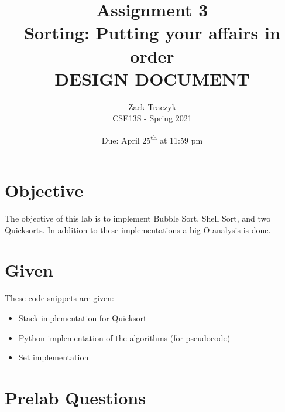 \documentclass[12pt]{article}
\title{%
    \textbf{Assignment 3 \\ 
    Sorting: Putting your affairs in order \\
    \large DESIGN DOCUMENT} }
\author{Zack Traczyk \\ CSE13S - Spring 2021}
\date{Due: April 25\textsuperscript{th} at 11:59 pm}
\begin{document}
    \maketitle


    \section{Objective}

    The objective of this lab is to implement Bubble Sort, Shell Sort, and two Quicksorts. In addition to these implementations a big O analysis is done.

    \section{Given}

    These code snippets are given:

    \begin{itemize}
        \item Stack implementation for Quicksort
        \item Python implementation of the algorithms (for pseudocode)
		\item Set implementation
    \end{itemize}


    \section{Prelab Questions}
\end{document}
